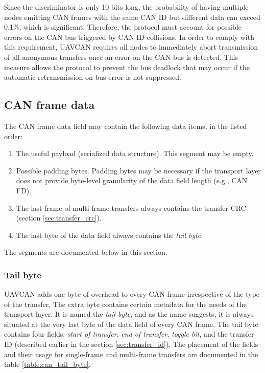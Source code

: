 Since the discriminator is only 10 bits long,
the probability of having multiple nodes emitting CAN frames with the same CAN ID
but different data can exceed 0.1\%, which is significant.
Therefore, the protocol must account for possible errors on the CAN bus triggered by CAN ID collisions.
In order to comply with this requirement,
UAVCAN requires all nodes to immediately abort transmission of all anonymous transfers once an error on
the CAN bus is detected.
This measure allows the protocol to prevent the bus deadlock that may occur if the automatic
retransmission on bus error is not suppressed.

\subsection{CAN frame data}

The CAN frame data field may contain the following data items, in the listed order:
\begin{enumerate}
    \item The useful payload (serialized data structure). This segment may be empty.
    \item Possible padding bytes.
          Padding bytes may be necessary if the transport layer does not provide byte-level
          granularity of the data field length (e.g., CAN FD).
    \item The last frame of multi-frame transfers always contains the transfer CRC (section \ref{sec:transfer_crc}).
    \item The last byte of the data field always contains the \emph{tail byte}.
\end{enumerate}
The segments are documented below in this section.

\subsubsection{Tail byte}

UAVCAN adds one byte of overhead to every CAN frame irrespective of the type of the transfer.
The extra byte contains certain metadata for the needs of the transport layer.
It is named the \emph{tail byte}, and as the name suggests, it is always situated
at the very last byte of the data field of every CAN frame.
The tail byte contains four fields: \emph{start of transfer}, \emph{end of transfer},
\emph{toggle bit}, and the transfer ID (described earlier in the section \ref{sec:transfer_id}).
The placement of the fields and their usage for single-frame and multi-frame transfers
are documented in the table \ref{table:can_tail_byte}.

